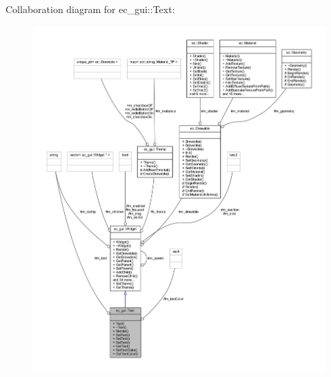 Collaboration diagram for ec\+\_\+gui\+:\+:Text\+:
\nopagebreak
\begin{figure}[H]
\begin{center}
\leavevmode
\includegraphics[width=350pt]{classec__gui_1_1_text__coll__graph}
\end{center}
\end{figure}
